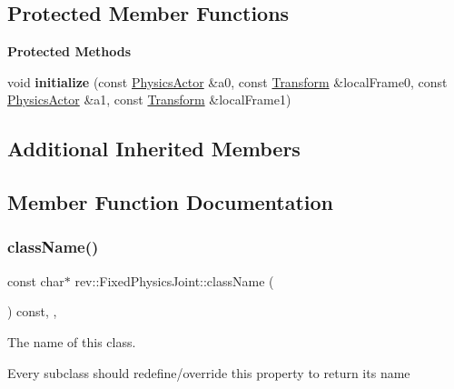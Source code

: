 \subsection*{Protected Member Functions}
\begin{Indent}\textbf{ Protected Methods}\par
\begin{DoxyCompactItemize}
\item 
\mbox{\label{classrev_1_1_fixed_physics_joint_aad56c94549cc3e8f7cf9d7c8613fe5a5}} 
void {\bfseries initialize} (const \mbox{\hyperlink{classrev_1_1_physics_actor}{Physics\+Actor}} \&a0, const \mbox{\hyperlink{classrev_1_1_transform}{Transform}} \&local\+Frame0, const \mbox{\hyperlink{classrev_1_1_physics_actor}{Physics\+Actor}} \&a1, const \mbox{\hyperlink{classrev_1_1_transform}{Transform}} \&local\+Frame1)
\end{DoxyCompactItemize}
\end{Indent}
\subsection*{Additional Inherited Members}


\subsection{Member Function Documentation}
\mbox{\label{classrev_1_1_fixed_physics_joint_a50a695b0b2cb3cb212ee03d38db3d981}} 
\subsubsection{\texorpdfstring{className()}{className()}}
{\footnotesize\ttfamily const char$\ast$ rev\+::\+Fixed\+Physics\+Joint\+::class\+Name (\begin{DoxyParamCaption}{ }\end{DoxyParamCaption}) const\hspace{0.3cm}{\ttfamily [inline]}, {\ttfamily [override]}, {\ttfamily [virtual]}}



The name of this class. 

Every subclass should redefine/override this property to return its name 

